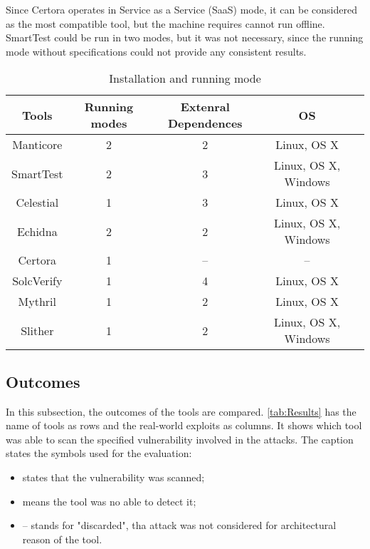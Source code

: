 Since Certora operates in Service as a Service (SaaS) mode, it can be considered as the most compatible tool, but the machine requires cannot run offline.
SmartTest could be run in two modes, but it was not necessary, since the running mode without specifications could not provide any consistent results.

\begin{center}
    \begin{table*}
        \caption{Installation and running mode}
        \label{tab:Installation}
        \begin{tabular}{ccccc}
        \toprule
            Tools  &  Running modes & Extenral Dependences & OS \\
            \midrule
            Manticore & 2 & 2 & Linux, OS X\\
            SmartTest & 2 & 3 & Linux, OS X, Windows \\
            Celestial & 1 & 3 & Linux, OS X\\
            Echidna & 2 & 2 & Linux, OS X, Windows\\
            Certora & 1 & -- & -- \\ 
            SolcVerify & 1 & 4  &  Linux, OS X \\
            Mythril  & 1 & 2  &  Linux, OS X \\ 
            Slither & 1 & 2 & Linux, OS X, Windows \\   
        \bottomrule
        \end{tabular}
    \end{table*}
\end{center}

\subsection{Outcomes} 
In this subsection, the outcomes of the tools are compared. 
\autoref{tab:Results} has the name of tools as rows and the real-world exploits as columns.
It shows which tool was able to scan the specified vulnerability involved in the attacks. 
The caption states the symbols used for the evaluation:
\begin{itemize}
    \item \checkmark states that the vulnerability was scanned;
    \item \xmark means the tool was no able to detect it;
    \item -- stands for "discarded", tha attack was not considered for architectural reason of the tool.
\end{itemize}

